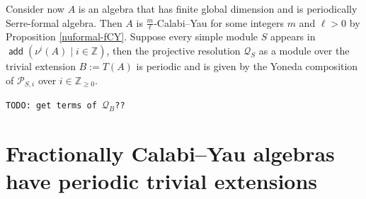 \documentclass[a4paper,reqno,11pt]{amsart}
\newtheorem{corollary}[theorem]{Corollary}
\newtheorem{lemma}[theorem]{Lemma}
\theoremstyle{definition}
\newcommand{\Z}{\mathbb{Z}}
\DeclareMathOperator{\add}{\mathsf{add}}
\newcommand{\stmod}{\mathop{\underline{\mod}}\nolimits}
\renewcommand{\comment}[1]{{\color{green!50!gray} #1}}
\numberwithin{equation}{section}
\begin{document}
Consider now $A$ is an algebra that has finite global dimension and is periodically Serre-formal algebra.
Then $A$ is $\frac{m}{\ell}$-Calabi--Yau for some integers $m$ and $\ell>0$ by Proposition \ref{nuformal-fCY}.
Suppose every simple module $S$ appears in $\add(\nu^i(A)\mid i\in \Z)$, then the projective resolution $\mathcal{Q}_S$ as a module over the trivial extension $B:=T(A)$ is periodic and is given by the Yoneda composition of $\mathcal{P}_{S,i}$ over $i\in \Z_{\geq 0}$.  

\comment{\texttt{TODO: get terms of $\mathcal{Q}_B$??}}

\section{Fractionally Calabi--Yau algebras have periodic trivial extensions}\label{sec:fCY to per}
\end{document}
